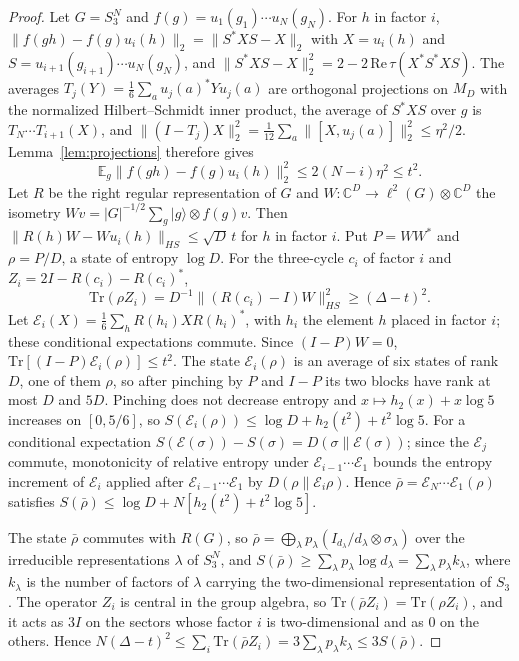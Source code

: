 \documentclass[11pt,a4paper]{article}
\theoremstyle{plain}
\theoremstyle{definition}
\theoremstyle{remark}
\begin{document}
\begin{proof}
Let $G=S_3^N$ and $f(g)=u_1(g_1)\cdots u_N(g_N)$. For $h$ in factor $i$, $\|f(gh)-f(g)u_i(h)\|_2=\|S^*XS-X\|_2$ with $X=u_i(h)$ and
$S=u_{i+1}(g_{i+1})\cdots u_N(g_N)$, and $\|S^*XS-X\|_2^2=2-2\,\mathrm{Re}\,\tau(X^*S^*XS)$. The averages
$T_j(Y)=\frac16\sum_au_j(a)^*Yu_j(a)$ are orthogonal projections on $M_D$ with the normalized Hilbert--Schmidt inner product, the
average of $S^*XS$ over $g$ is $T_N\cdots T_{i+1}(X)$, and $\|(I-T_j)X\|_2^2=\frac1{12}\sum_a\|[X,u_j(a)]\|_2^2\le\eta^2/2$.
Lemma~\ref{lem:projections} therefore gives
\[
\mathbb E_g\|f(gh)-f(g)u_i(h)\|_2^2\le2(N-i)\eta^2\le t^2 .
\]
Let $R$ be the right regular representation of $G$ and $W:\mathbb C^D\to\ell^2(G)\otimes\mathbb C^D$ the isometry
$Wv=|G|^{-1/2}\sum_g|g\rangle\otimes f(g)v$. Then $\|R(h)W-Wu_i(h)\|_{HS}\le\sqrt D\,t$ for $h$ in factor $i$. Put $P=WW^*$ and
$\rho=P/D$, a state of entropy $\log D$. For the three-cycle $c_i$ of factor $i$ and $Z_i=2I-R(c_i)-R(c_i)^*$,
\[
\mathrm{Tr}(\rho Z_i)=D^{-1}\|(R(c_i)-I)W\|_{HS}^2\ge(\Delta-t)^2 .
\]
Let $\mathcal E_i(X)=\frac16\sum_hR(h_i)XR(h_i)^*$, with $h_i$ the element $h$ placed in factor $i$; these conditional expectations
commute. Since $(I-P)W=0$, $\mathrm{Tr}[(I-P)\mathcal E_i(\rho)]\le t^2$. The state $\mathcal E_i(\rho)$ is an average of six states of rank
$D$, one of them $\rho$, so after pinching by $P$ and $I-P$ its two blocks have rank at most $D$ and $5D$. Pinching does not decrease
entropy and $x\mapsto h_2(x)+x\log5$ increases on $[0,5/6]$, so $S(\mathcal E_i(\rho))\le\log D+h_2(t^2)+t^2\log5$. For a conditional
expectation $S(\mathcal E(\sigma))-S(\sigma)=D(\sigma\|\mathcal E(\sigma))$; since the $\mathcal E_j$ commute, monotonicity of relative entropy
under $\mathcal E_{i-1}\cdots\mathcal E_1$ bounds the entropy increment of $\mathcal E_i$ applied after $\mathcal E_{i-1}\cdots\mathcal E_1$ by
$D(\rho\|\mathcal E_i\rho)$. Hence $\bar\rho=\mathcal E_N\cdots\mathcal E_1(\rho)$ satisfies $S(\bar\rho)\le\log D+N[h_2(t^2)+t^2\log5]$.

The state $\bar\rho$ commutes with $R(G)$, so $\bar\rho=\bigoplus_\lambda p_\lambda(I_{d_\lambda}/d_\lambda\otimes\sigma_\lambda)$ over the irreducible
representations $\lambda$ of $S_3^N$, and $S(\bar\rho)\ge\sum_\lambda p_\lambda\log d_\lambda=\sum_\lambda p_\lambda k_\lambda$, where $k_\lambda$ is the
number of factors of $\lambda$ carrying the two-dimensional representation of $S_3$. The operator $Z_i$ is central in the group
algebra, so $\mathrm{Tr}(\bar\rho Z_i)=\mathrm{Tr}(\rho Z_i)$, and it acts as $3I$ on the sectors whose factor $i$ is two-dimensional and as
$0$ on the others. Hence $N(\Delta-t)^2\le\sum_i\mathrm{Tr}(\bar\rho Z_i)=3\sum_\lambda p_\lambda k_\lambda\le3S(\bar\rho)$.
\end{proof}
\end{document}

